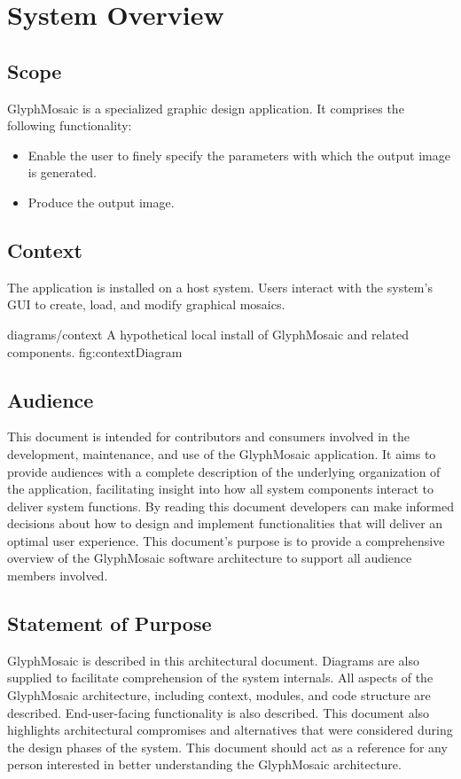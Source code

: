 \section{System Overview}
\subsection{Scope}
GlyphMosaic is a specialized graphic design application.
It comprises the following functionality:
\begin{itemize}
  \item Enable the user to finely specify the parameters with which the output image is generated.
  \item Produce the output image.
\end{itemize}


\subsection{Context}
The application is installed on a host system.
Users interact with the system's GUI to create, load, and modify graphical mosaics.

\sidiagram
{diagrams/context}
{A hypothetical local install of GlyphMosaic and related components.}
{fig:contextDiagram}
{\diagsize}


\subsection{Audience}
This document is intended for contributors and consumers involved in the development, maintenance, and use of the GlyphMosaic application.
It aims to provide audiences with a complete description of the underlying organization of the application, facilitating insight into how all system components interact to deliver system functions.
By reading this document developers can make informed decisions about how to design and implement functionalities that will deliver an optimal user experience.
This document's purpose is to provide a comprehensive overview of the GlyphMosaic software architecture to support all audience members involved.


\subsection{Statement of Purpose}
GlyphMosaic is described in this architectural document.
Diagrams are also supplied to facilitate comprehension of the system internals.
All aspects of the GlyphMosaic architecture, including context, modules, and code structure are described.
End-user-facing functionality is also described.
This document also highlights architectural compromises and alternatives that were considered during the design phases of the system.
This document should act as a reference for any person interested in better understanding the GlyphMosaic architecture.

